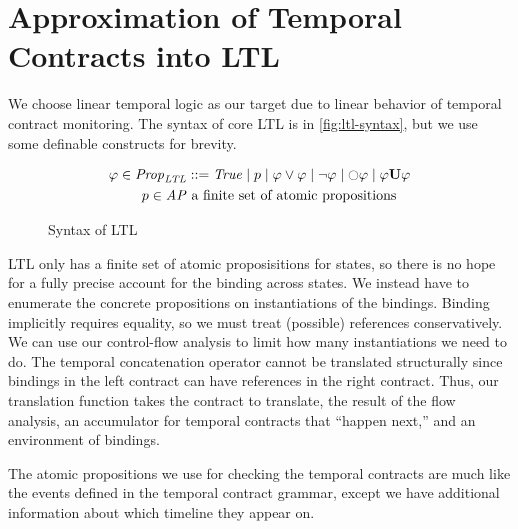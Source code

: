 \documentclass[preprint,onecolumn,9pt]{sigplanconf} %
\begin{document}
\section{Approximation of Temporal Contracts into LTL}

We choose linear temporal logic as our target due to linear behavior of temporal contract monitoring.
%
The syntax of core LTL is in \autoref{fig:ltl-syntax}, but we use some definable constructs for brevity.
%
\begin{figure}
  \begin{align*}
    \ltlprop \in \LTLProp &::= \ltlTrue \alt \ltlatom \alt \ltlor{\ltlprop}{\ltlprop} \alt \ltlnot{\ltlprop} \alt \ltlnext{\ltlprop} \alt \ltluntil{\ltlprop}{\ltlprop}
\\
    \ltlatom \in \ltlAP & \text{ a finite set of atomic propositions}
  \end{align*}
  \caption{Syntax of LTL}
  \label{fig:ltl-syntax}
\end{figure}
LTL only has a finite set of atomic proposisitions for states, so there is no hope for a fully precise account for the binding across states.
%
We instead have to enumerate the concrete propositions on instantiations of the bindings.
%
Binding implicitly requires equality, so we must treat (possible) references conservatively.
%
We can use our control-flow analysis to limit how many instantiations we need to do.
%
The temporal concatenation operator cannot be translated structurally since bindings in the left contract can have references in the right contract.
%
Thus, our translation function takes the contract to translate, the result of the flow analysis, an accumulator for temporal contracts that ``happen next,'' and an environment of bindings.

The atomic propositions we use for checking the temporal contracts are much like the events defined in the temporal contract grammar, except we have additional information about which timeline they appear on.
\end{document}

